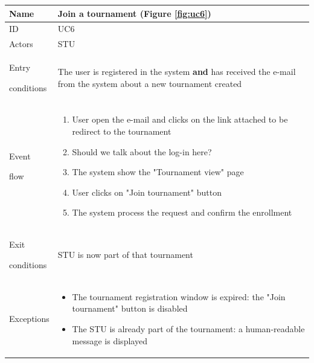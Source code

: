 \begin{center}
    \def\arraystretch{1.5}
    \begin{tabular}{| m{2cm} | m{10cm}|}
        \hline
        Name                  & Join a tournament  (Figure \ref{fig:uc6}) \\ \hline
        ID                    & UC6                                       \\ \hline
        Actors                & STU                                       \\ \hline
        Entry \par conditions & The user is registered in the system \textbf{and} has received the e-mail from the system about a new tournament created                                       \\ \hline
        Event \par flow       & \begin{enumerate}
                                    \item User open the e-mail and clicks on the link attached to be redirect to the tournament
                                    \item {\color{red} Should we talk about the log-in here?}
                                    \item The system show the "Tournament view" page
                                    \item User clicks on "Join tournament" button
                                    \item The system process the request and confirm the enrollment 
                                \end{enumerate}                          \\ \hline
        Exit \par conditions  & STU is now part of that tournament   \\ \hline
        Exceptions            & \begin{itemize}
                                    \item The tournament registration window is expired: the "Join tournament" button is disabled
                                    \item The STU is already part of the tournament: a human-readable message is displayed 
                                \end{itemize}                            \\ \hline
    \end{tabular}
\end{center}

